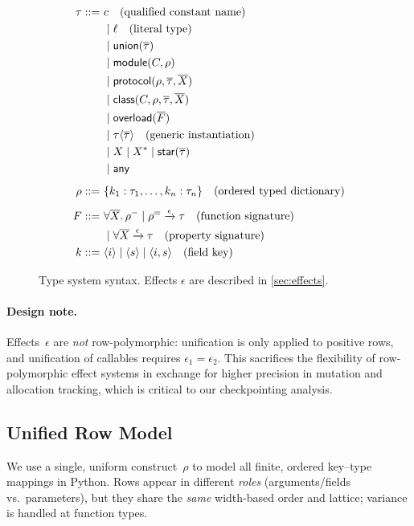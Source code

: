 \begin{figure}[t]
\centering
\begin{align*}
\tau ::=~& c \quad\text{(qualified constant name)} \\
 & \mid \ell \quad\text{(literal type)} \\
 & \mid \mathsf{union}(\overline{\tau}) \\
 & \mid \mathsf{module}(C, \mathord{\rho}) \\
 & \mid \mathsf{protocol}(\mathord{\rho}, \overline{\tau}, \overline{X}) \\
 & \mid \mathsf{class}(C, \mathord{\rho}, \overline{\tau}, \overline{X}) \\
 & \mid \mathsf{overload}(\overline{F}) \\
 & \mid \tau\langle\overline{\tau}\rangle \quad\text{(generic instantiation)} \\
 & \mid X \mid X^* \mid \mathsf{star}(\overline{\tau}) \\
 & \mid \mathsf{any}
\\[0.5em]
\mathord{\rho} ::=~& \{ k_1 : \tau_1, \ldots, k_n : \tau_n \} \quad\text{(ordered typed dictionary)}
\\[0.5em]
F ::=~& \forall \overline{X}.\,\mathord{\rho^{-}} \mid \mathord{\rho^{=}} \xrightarrow{\epsilon} \tau
\quad\text{(function signature)}\\
 & \mid \forall \overline{X}\xrightarrow{\epsilon} \tau \quad\text{(property signature)}
\\
k ::=~& \langle i\rangle \mid \langle s\rangle \mid \langle i, s\rangle
\quad\text{(field key)}
\end{align*}
\caption{Type system syntax. Effects $\epsilon$ are described in \autoref{sec:effects}.}
\label{fig:type-syntax}
\end{figure}

\paragraph{Design note.}
Effects~$\epsilon$ are \emph{not} row-polymorphic: unification is only applied to positive rows, and unification of callables requires $\epsilon_1 = \epsilon_2$.  
This sacrifices the flexibility of row-polymorphic effect systems in exchange for higher precision in mutation and allocation tracking, which is critical to our checkpointing analysis.
\subsection{Unified Row Model}
\label{sec:unified-record}
We use a single, uniform construct~$\rho$ to model all finite, ordered key--type mappings in Python.
Rows appear in different \emph{roles} (arguments/fields vs.\ parameters), but they share the \emph{same} width-based order and lattice; variance is handled at function types.


